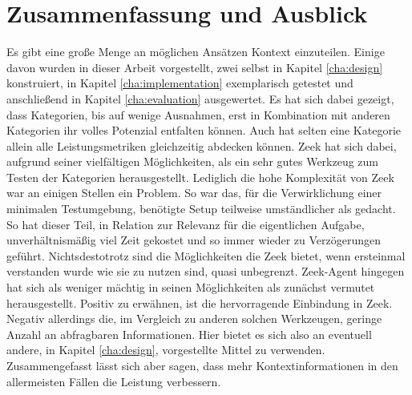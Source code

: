 \chapter{Zusammenfassung und Ausblick}%
\label{cha:conclusion}


Es gibt eine große Menge an möglichen Ansätzen Kontext einzuteilen. Einige davon wurden in dieser Arbeit vorgestellt, zwei selbst in Kapitel \ref{cha:design} konstruiert, in Kapitel \ref{cha:implementation} exemplarisch getestet und anschließend in Kapitel \ref{cha:evaluation} ausgewertet. Es hat sich dabei gezeigt, dass Kategorien, bis auf wenige Ausnahmen, erst in Kombination mit anderen Kategorien ihr volles Potenzial entfalten können. Auch hat selten eine Kategorie allein alle Leistungsmetriken gleichzeitig abdecken können. Zeek hat sich dabei, aufgrund seiner vielfältigen Möglichkeiten, als ein sehr gutes Werkzeug zum Testen der Kategorien herausgestellt. Lediglich die hohe Komplexität von Zeek war an einigen Stellen ein Problem. So war das, für die Verwirklichung einer minimalen Testumgebung, benötigte Setup teilweise umständlicher als gedacht. So hat dieser Teil, in Relation zur Relevanz für die eigentlichen Aufgabe, unverhältnismäßig viel Zeit gekostet und so immer wieder zu Verzögerungen geführt. Nichtsdestotrotz sind die Möglichkeiten die Zeek bietet, wenn ersteinmal verstanden wurde wie sie zu nutzen sind, quasi unbegrenzt. Zeek-Agent hingegen hat sich als weniger mächtig in seinen Möglichkeiten als zunächst vermutet herausgestellt. Positiv zu erwähnen, ist die hervorragende Einbindung in Zeek. Negativ allerdings die, im Vergleich zu anderen solchen Werkzeugen, geringe Anzahl an abfragbaren Informationen. Hier bietet es sich also an eventuell andere, in Kapitel \ref{cha:design}, vorgestellte Mittel zu verwenden. Zusammengefasst lässt sich aber sagen, dass mehr Kontextinformationen  in den allermeisten Fällen die Leistung verbessern.\newline
